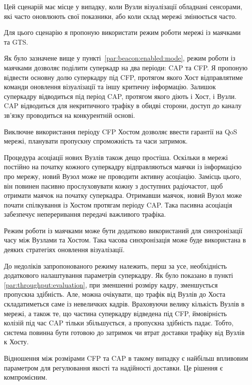\documentclass[a4paper,ukrainian,utf8,nocolumnsxix,floatsection,equationsection]{eskdtext}
\begin{document}
Цей сценарій має місце у випадку, коли Вузли візуалізації обладнані сенсорами, які часто  оновлюють свої показники, або коли склад мережі змінюється часто.

Для цього сценарію я пропоную використати режим роботи мережі із маячками та GTS.

Як було зазначене вище у пункті~\ref{par:beacon:enabled:mode}, режим роботи із маячками дозволяє поділити суперкадр на два періоди: CAP та CFP. Я пропоную відвести основну долю суперкадру під CFP, протягом якого Хост відправлятиме команди оновлення візуалізації та іншу критичну інформацію. Залишок суперкадру відводиться під період CAP, протягом якого діють і Хост, і Вузли. CAP відводиться для некритичного трафіку в обидві сторони, доступ до каналу зв’язку проводиться на конкурентній основі. 

Виключне використання періоду CFP Хостом дозволяє ввести гарантії на QoS мережі, планувати пропускну спроможність та часи затримок. 

Процедура асоціації нових Вузлів також дещо простіша. Оскільки в мережі постійно на початку кожного суперкадру відправляються маячки із інформацією про мережу, новий Вузол може не проводити активну асоціацію. Замісць цього, він повинен пасивно прослуховувати кожну з доступних радіочастот, щоб отримати маячок на початку суперкадра. Отримавши маячок, новий Вузол може почати спілкування із Хостом протягам періоду CAP. Така пасивна асоціація забезпечує непереривання передачі важливого трафіка.

Режим роботи із маячками може бути додатково використаний для синхронізації часу між Вузлами та Хостом. Така часова синхронізація може буде використана в деяких стратегіях оновлення візуалізації.

До недоліків запропонованого режиму належить, перш за усе, необхідність додаткового налаштування параметрів суперкадру. Як було показано в пункті \ref{par:throughput:evaluation}, при зменшенні розміру кадру, зменшується пропускна здібність. Але, можна очікувати, що трафік від Вузлів до Хоста складатиметься саме із невеличких кадрів. Враховуючи велику кількість Вузлів в мережі, а також те, що частина суперкадру відведена під CFP, ймовірність колізій під час CAP тільки збільшується, а пропускна здібність падає. Тобто, система повинна бути готовою до затримок чи втрат доставки трафіку від Вузлів к Хосту. 

Відношення між розмірами CFP та CAP в такому випадку є найбільш впливовим параметром для регулювання якості та надійності доставки. Це рішення є компромісним.
\end{document}
